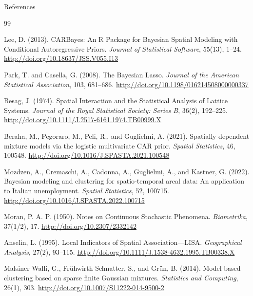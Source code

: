 \begin{frame}[allowframebreaks]{References}
\scriptsize
\begin{thebibliography}{99}

Lee, D. (2013).
\newblock CARBayes: An R Package for Bayesian Spatial Modeling with Conditional Autoregressive Priors.
\newblock \emph{Journal of Statistical Software}, 55(13), 1--24.
\newblock \url{http://doi.org/10.18637/JSS.V055.I13}

Park, T. and Casella, G. (2008).
\newblock The Bayesian Lasso.
\newblock \emph{Journal of the American Statistical Association}, 103, 681--686.
\newblock \url{http://doi.org/10.1198/016214508000000337}

Besag, J. (1974).
\newblock Spatial Interaction and the Statistical Analysis of Lattice Systems.
\newblock \emph{Journal of the Royal Statistical Society: Series B}, 36(2), 192--225.
\newblock \url{http://doi.org/10.1111/J.2517-6161.1974.TB00999.X}

Beraha, M., Pegoraro, M., Peli, R., and Guglielmi, A. (2021).
\newblock Spatially dependent mixture models via the logistic multivariate CAR prior.
\newblock \emph{Spatial Statistics}, 46, 100548.
\newblock \url{http://doi.org/10.1016/J.SPASTA.2021.100548}

Mozdzen, A., Cremaschi, A., Cadonna, A., Guglielmi, A., and Kastner, G. (2022).
\newblock Bayesian modeling and clustering for spatio-temporal areal data: An application to Italian unemployment.
\newblock \emph{Spatial Statistics}, 52, 100715.
\newblock \url{http://doi.org/10.1016/J.SPASTA.2022.100715}

Moran, P. A. P. (1950).
\newblock Notes on Continuous Stochastic Phenomena.
\newblock \emph{Biometrika}, 37(1/2), 17.
\newblock \url{http://doi.org/10.2307/2332142}

Anselin, L. (1995).
\newblock Local Indicators of Spatial Association---LISA.
\newblock \emph{Geographical Analysis}, 27(2), 93--115.
\newblock \url{http://doi.org/10.1111/J.1538-4632.1995.TB00338.X}

Malsiner-Walli, G., Fr\"uhwirth-Schnatter, S., and Gr\"un, B. (2014).
\newblock Model-based clustering based on sparse finite Gaussian mixtures.
\newblock \emph{Statistics and Computing}, 26(1), 303.
\newblock \url{http://doi.org/10.1007/S11222-014-9500-2}


\end{thebibliography}
\end{frame}
